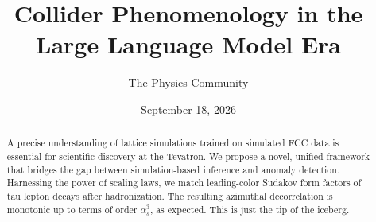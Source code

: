 \documentclass[11pt]{article}
\title{Collider Phenomenology in the Large Language Model Era}
\author{The Physics Community}
\date{September 18, 2026}
\numberwithin{equation}{section}
\theoremstyle{definition}
\theoremstyle{remark}
\begin{document}
\maketitle
\begin{abstract}
A precise understanding of lattice simulations trained on simulated FCC
data is essential for scientific discovery at the Tevatron. We propose a
novel, unified framework that bridges the gap between simulation-based
inference and anomaly detection. Harnessing the power of scaling laws,
we match leading-color Sudakov form factors of tau lepton decays after
hadronization. The resulting azimuthal decorrelation is monotonic up to
terms of order $\alpha_s^3$, as expected. This is just the tip of the
iceberg.
\end{abstract}
\tableofcontents




\nocite{*}


\end{document}
